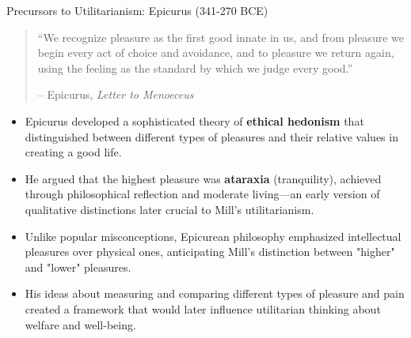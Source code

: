 \documentclass[aspectratio=169]{beamer}
\begin{document}
\begin{frame}{Precursors to Utilitarianism: Epicurus (341-270 BCE)}
    \begin{quote}
        ``We recognize pleasure as the first good innate in us, and from pleasure we begin every act of choice and avoidance, and to pleasure we return again, using the feeling as the standard by which we judge every good.''
        \vspace{0.5em}
        
        -- Epicurus, \textit{Letter to Menoeceus}
    \end{quote}
    \begin{itemize}
        \item Epicurus developed a sophisticated theory of \textbf{ethical hedonism} that distinguished between different types of pleasures and their relative values in creating a good life.
        
        \item He argued that the highest pleasure was \textbf{ataraxia} (tranquility), achieved through philosophical reflection and moderate living—an early version of qualitative distinctions later crucial to Mill's utilitarianism.
        
        \item Unlike popular misconceptions, Epicurean philosophy emphasized intellectual pleasures over physical ones, anticipating Mill's distinction between "higher" and "lower" pleasures.
        
        \item His ideas about measuring and comparing different types of pleasure and pain created a framework that would later influence utilitarian thinking about welfare and well-being.
    \end{itemize}
\end{frame}
\end{document}
